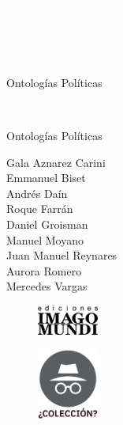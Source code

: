 \newpage
\thispagestyle{empty}
{\textcolor{white}{.}}

\newpage
\thispagestyle{empty}
{\textcolor{white}{.}}

\newpage
\thispagestyle{empty}
{\textcolor{white}{.}}

\vspace{30mm}

\begin{center}
	\LARGE{Ontologías Políticas}
\end{center}

\newpage
\thispagestyle{empty}
{\textcolor{white}{.}}

\newpage
\thispagestyle{empty}

\vspace{30mm}

\begin{center}
	\LARGE{Ontologías Políticas}\\\vspace{10mm}

	\Large{}
\end{center}

\vspace{10mm}

\begin{center}%
{\sc\large{Gala Aznarez Carini\\
		Emmanuel Biset\\
		Andrés Daín\\
		Roque Farrán\\
		Daniel Groisman\\
		Manuel Moyano\\
		Juan Manuel Reynares\\
		Aurora Romero\\
		Mercedes Vargas}}\\ %
\end{center}



\vfill

\begin{figure}[b]
\centering
\includegraphics[width=20mm]{./media/logo-imago-ByW.png}
\end{figure}

\newpage
\thispagestyle{empty}
\begin{figure}[t]
\centering
\vspace{-10mm}
\includegraphics[width=20mm]{./media/desconocido.png}\\
\end{figure}

